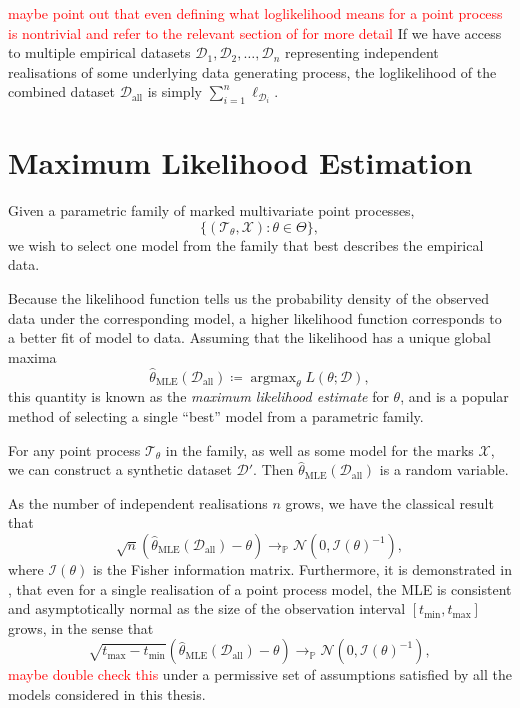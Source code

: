 \documentclass[honours,12pt]{unswthesis}
\DeclareMathOperator*{\argmax}{argmax}
\numberwithin{equation}{section}
\begin{document}
\textcolor{red}{maybe point out that even defining what loglikelihood means for a point process is nontrivial and refer to the relevant section of \cite{DaleyVereJones} for more detail}
If we have access to multiple empirical datasets $\mathcal{D}_1,\mathcal{D}_2,\ldots,\mathcal{D}_n$ representing independent realisations of some underlying data generating process, the loglikelihood of the combined dataset $\mathcal{D}_\mathrm{all}$ is simply $\sum_{i=1}^n \ell_{\mathcal{D}_i}$.

\section{Maximum Likelihood Estimation}
Given a parametric family of marked multivariate point processes,
$$\{(\mathcal{T}_\theta,\mathcal{X}) : \theta\in\Theta\},$$
we wish to select one model from the family that best describes the empirical data.

Because the likelihood function tells us the probability density of the observed data under the corresponding model, a higher likelihood function corresponds to a better fit of model to data. Assuming that the likelihood has a unique global maxima
$$\hat\theta_\mathrm{MLE}(\mathcal{D}_\mathrm{all}) \coloneq \argmax_\theta L(\theta;\mathcal{D}),$$
this quantity is known as the \textit{maximum likelihood estimate} for $\theta$, and is a popular method of selecting a single ``best'' model from a parametric family.

For any point process $\mathcal{T}_\theta$ in the family, as well as some model for the marks $\mathcal{X}$, we can construct a synthetic dataset $\mathcal{D}'$. Then $\hat\theta_\mathrm{MLE}(\mathcal{D}_\mathrm{all})$ is a random variable.

As the number of independent realisations $n$ grows, we have the classical result that
$$\sqrt{n}\left(\hat\theta_\mathrm{MLE}(\mathcal{D}_\mathrm{all})-\theta\right) \to_\mathbb{P} \mathcal{N}(0,\mathcal{I}(\theta)^{-1}),$$
where $\mathcal{I}(\theta)$ is the Fisher information matrix. Furthermore, it is demonstrated in \cite{Ogata1977}, that even for a single realisation of a point process model, the MLE is consistent and asymptotically normal as the size of the observation interval $[t_\mathrm{min},t_\mathrm{max}]$ grows, in the sense that
$$\sqrt{t_\mathrm{max}-t_\mathrm{min}}\left(\hat\theta_\mathrm{MLE}(\mathcal{D}_\mathrm{all})-\theta\right) \to_\mathbb{P} \mathcal{N}(0,\mathcal{I}(\theta)^{-1}),$$
\textcolor{red}{maybe double check this}
under a permissive set of assumptions satisfied by all the models considered in this thesis.
\end{document}
